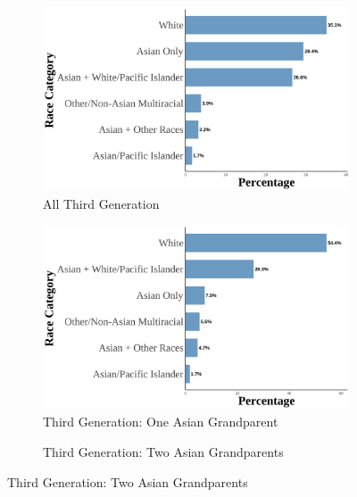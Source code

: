 \pagebreak
\newpage

\pagebreak
\newpage

\begin{landscape}
\begin{figure}[!htb]
\centering
\caption{Asian Racial Identity: Third Generation}
\label{fig:histogram-thirdgen}

\begin{subfigure}{.32\textwidth}
\caption{All Third Generation}
\centering
\includegraphics[width=1\linewidth]{histogram_asian_american_race_thirdgen.png}
\end{subfigure}
\hfill
\begin{subfigure}{.32\textwidth}
\caption{Third Generation: One Asian Grandparent}
\centering
\includegraphics[width=1\linewidth]{histogram_asian_american_race_thirdgen_oneasiangran.png}
\end{subfigure}
\hfill
\begin{subfigure}{.32\textwidth}
\caption{Third Generation: Two Asian Grandparents}
\centering

\end{subfigure}
\end{figure}
\end{landscape}
